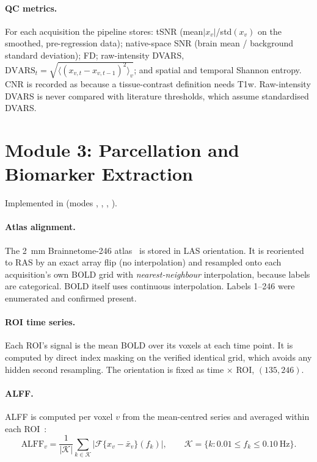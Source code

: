 \documentclass{ssnreview}
\begin{document}
\paragraph{QC metrics.} For each acquisition the pipeline stores: tSNR
(mean$|x_v|$/std$(x_v)$ on the smoothed, pre-regression data); native-space
SNR (brain mean / background standard deviation); FD; raw-intensity DVARS,
$\text{DVARS}_t = \sqrt{\langle (x_{v,t}-x_{v,t-1})^2\rangle_v}$; and spatial
and temporal Shannon entropy. CNR is recorded as
 because a tissue-contrast definition needs T1w.
Raw-intensity DVARS is never compared with literature thresholds, which assume
standardised DVARS.

\section{Module 3: Parcellation and Biomarker Extraction}
Implemented in 
(modes , , , ).

\paragraph{Atlas alignment.} The 2~mm Brainnetome-246 atlas~\cite{fan2016} is
stored in LAS orientation. It is reoriented to RAS by an exact array flip
(no interpolation) and resampled onto each acquisition's own BOLD grid with
\emph{nearest-neighbour} interpolation, because labels are categorical. BOLD
itself uses continuous interpolation. Labels 1--246 were enumerated and
confirmed present.

\paragraph{ROI time series.} Each ROI's signal is the mean BOLD over its voxels
at each time point. It is computed by direct index masking on the verified
identical grid, which avoids any hidden second resampling. The orientation is
fixed as time $\times$ ROI, $(135, 246)$.

\paragraph{ALFF.} ALFF is computed per voxel $v$ from the
mean-centred series and averaged within each ROI~\cite{zang2007}:
\begin{equation}
  \text{ALFF}_v = \frac{1}{|\mathcal{K}|}\sum_{k\in\mathcal{K}}
  \left|\mathcal{F}\{x_v-\bar{x}_v\}(f_k)\right|,
  \qquad \mathcal{K} = \{k : 0.01 \le f_k \le 0.10~\text{Hz}\}.
\end{equation}
\end{document}
